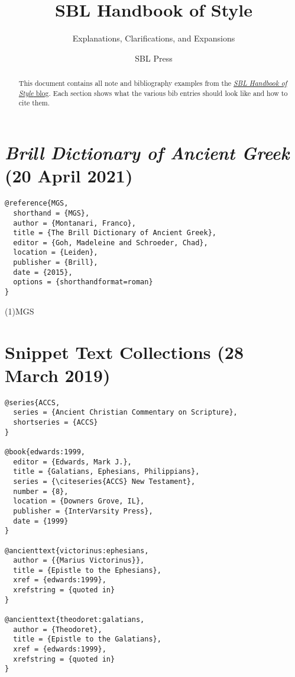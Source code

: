 \documentclass[a4paper]{article}
\begin{document}
\title{SBL Handbook of Style}
\author{Explanations, Clarifications, and Expansions}
\date{SBL Press}
\maketitle

\begin{abstract}
  This document contains all note and bibliography examples from the
  \href{https://sblhs2.com/}{\emph{SBL Handbook of Style} blog}. Each section
  shows what the various bib entries should look like and how to cite them.
\end{abstract}

\tableofcontents

\section{\emph{Brill Dictionary of Ancient Greek} (20 April 2021)}

\begin{verbatim}
@reference{MGS,
  shorthand = {MGS},
  author = {Montanari, Franco},
  title = {The Brill Dictionary of Ancient Greek},
  editor = {Goh, Madeleine and Schroeder, Chad},
  location = {Leiden},
  publisher = {Brill},
  date = {2015},
  options = {shorthandformat=roman}
}
\end{verbatim}

\examplecite(1){MGS}
\exampleabbreviations
{}

\section{Snippet Text Collections (28 March 2019)}

\begin{verbatim}
@series{ACCS,
  series = {Ancient Christian Commentary on Scripture},
  shortseries = {ACCS}
}

@book{edwards:1999,
  editor = {Edwards, Mark J.},
  title = {Galatians, Ephesians, Philippians},
  series = {\citeseries{ACCS} New Testament},
  number = {8},
  location = {Downers Grove, IL},
  publisher = {InterVarsity Press},
  date = {1999}
}

@ancienttext{victorinus:ephesians,
  author = {{Marius Victorinus}},
  title = {Epistle to the Ephesians},
  xref = {edwards:1999},
  xrefstring = {quoted in}
}

@ancienttext{theodoret:galatians,
  author = {Theodoret},
  title = {Epistle to the Galatians},
  xref = {edwards:1999},
  xrefstring = {quoted in}
}
\end{verbatim}
\end{document}
